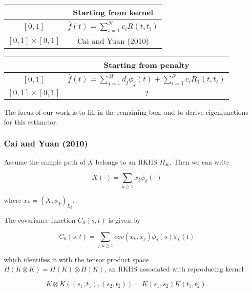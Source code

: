 \begin{frame}

\begin{table}
\begin{tabular}{|c|c|}
\hline
& Starting from kernel \\[0.3cm]
\hline 
$[0,1]$ &$\hat{f}(t) =  \sum_{i=1}^N c_iR(t, t_i)$ \\[0.3cm]
\hline
$[0,1]\times [0,1]$ & Cai and Yuan (2010) \\[0.3cm]
\hline
\end{tabular}
\end{table}

\begin{table}
\begin{tabular}{|c|c|}
\hline
 & Starting from penalty \\[0.3cm]
\hline 
$[0,1]$ & $\hat{f}(t) = \sum_{j=1}^M d_j\phi_j(t) + \sum_{i=1}^N c_iR_1(t, t_i)$\\[0.3cm]
\hline
$[0,1]\times [0,1]$  & $?$\\[0.3cm]
\hline
\end{tabular}
\end{table}

The focus of our work is to fill in the remaining box, and to derive eigenfunctions for this estimator.
\end{frame}

\begin{frame}\frametitle{Cai and Yuan (2010)}
Assume the sample path of $X$ belongs to an RKHS $H_{K}.$ Then we
can write

\[
X(\cdot)=\sum_{k\geq1}x_{k}\phi_{k}(\cdot)\]


where $x_{k}=(X,\phi_{k})_{L_{2}}$.

The covariance function $C_{0}(s,t)$ is given by

\[
C_{0}(s,t)=\sum_{j,k\geq1}cov(x_{k},x_{j})\phi_{j}(s)\phi_{k}(t)\]


which identifies it with the tensor product space $H(K\otimes K)=H(K)\otimes H(K)$,
an RKHS associated with reproducing kernel

\[
K\otimes K((s_{1},t_{1}),(s_{2},t_{2}))=K(s_{1},s_{2})K(t_{1},t_{2}).\]
\end{frame}

%
%
%
%
%
%
%

